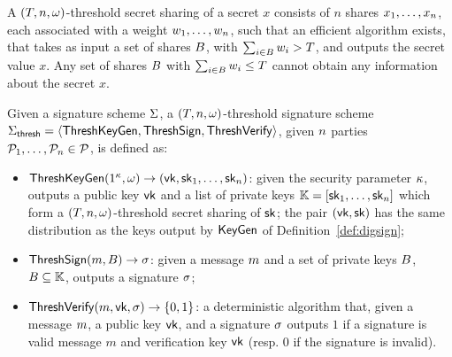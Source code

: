 \begin{definition}\label{def:thresh-ss}
    A $(T, n, \omega)$-threshold secret sharing of a secret
    $x$ consists of $n$ shares $x_1, \dots, x_{n}$, each associated
    with a weight $w_1, \dots, w_n$, such that an
    efficient algorithm exists, that takes as input a set of shares
    $B$, with $\sum_{i \in B} w_i > T$, and
    outputs the secret value $x$. Any set of shares $B$
    with $\sum_{i \in B} w_i \leq T$ cannot obtain any
    information about the secret $x$.
\end{definition}

\begin{definition}\label{def:thresh-sig}
    Given a signature scheme $\Sigma$, a $(T, n,
    \omega)$-threshold signature scheme $\Sigma_{\mathsf{thresh}} = \langle \mathsf{ThreshKeyGen}, \mathsf{ThreshSign}, \mathsf{ThreshVerify} \rangle$, given $n$ parties
    $\mathcal{P}_1, \dots, \mathcal{P}_{n} \in \mathcal{P}$, is defined as:
    \begin{itemize}
        \item $\mathsf{ThreshKeyGen}(1^\kappa, \omega) \rightarrow (\mathsf{vk},
            \mathsf{sk}_1, \dots, \mathsf{sk}_n)$:
            given the security parameter $\kappa$, outputs a public key
            $\mathsf{vk}$ and a list of private keys $\mathbb{K} = [\mathsf{sk}_{1}, \dots,
            \mathsf{sk}_{n}]$ which form a $(T, n,
            \omega)$-threshold secret sharing of $\mathsf{sk}$; the pair
            $(\mathsf{vk}, \mathsf{sk})$ has the same distribution as the keys
            output by $\mathsf{KeyGen}$ of Definition~\ref{def:digsign};

        \item $\mathsf{ThreshSign}(m, B) \rightarrow \sigma$:
            given a message $m$ and a set of private keys
            $B$, $B \subseteq \mathbb{K}$, outputs a
            signature $\sigma$;

        \item $\mathsf{ThreshVerify}(m, \mathsf{vk}, \sigma) \rightarrow \{0,1\}$: a
            deterministic algorithm that, given a message $m$, a public key
            $\mathsf{vk}$, and a signature $\sigma$ outputs $1$ if a
            signature is valid \wrt message $m$ and verification key
            $\mathsf{vk}$ (resp. $0$ if the signature is invalid).
    \end{itemize}


\end{definition}
